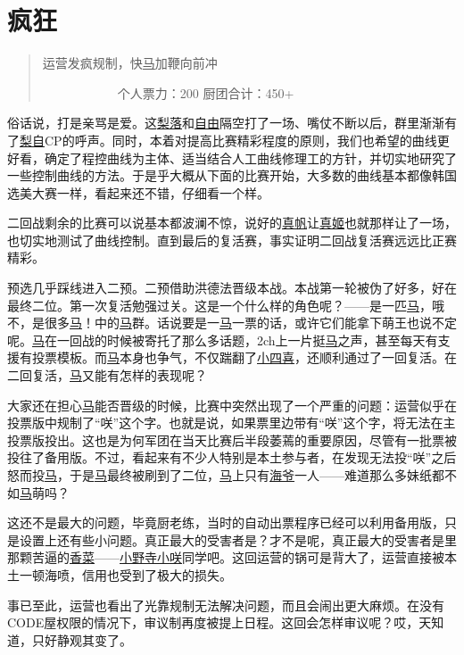 \chapter{疯狂}
\begin{quote}
运营发疯规制，快\uline{马}加鞭向前冲

　　　　　　个人票力：200 厨团合计：450+
\end{quote}

俗话说，打是亲骂是爱。这\uline{梨落}和\uline{自由}隔空打了一场、嘴仗不断以后，群里渐渐有了\uline{梨}\uline{自}CP的呼声。同时，本着对提高比赛精彩程度的原则，我们也希望的曲线更好看，确定了程控曲线为主体、适当结合人工曲线修理工的方针，并切实地研究了一些控制曲线的方法。于是乎大概从下面的比赛开始，大多数的曲线基本都像韩国选美大赛一样，看起来还不错，仔细看一个样。

二回战剩余的比赛可以说基本都波澜不惊，说好的\uline{真帆}让\uline{真姬}也就那样让了一场，也切实地测试了曲线控制。直到最后的复活赛，事实证明二回战复活赛远远比正赛精彩。

预选几乎踩线进入二预。二预借助洪德法晋级本战。本战第一轮被伪了好多，好在最终二位。第一次复活勉强过关。这是一个什么样的角色呢？——是一匹\uline{马}，哦不，是很多\uline{马}！中的\uline{马}群。话说要是一\uline{马}一票的话，或许它们能拿下萌王也说不定呢。\uline{马}在一回战的时候被寄托了那么多话题，2ch上一片挺\uline{马}之声，甚至每天有支援有投票模板。而\uline{马}本身也争气，不仅踹翻了\uline{小四喜}，还顺利通过了一回复活。在二回复活，\uline{马}又能有怎样的表现呢？

大家还在担心\uline{马}能否晋级的时候，比赛中突然出现了一个严重的问题：运营似乎在投票版中规制了“咲”这个字。也就是说，如果票里边带有“咲”这个字，将无法在主投票版投出。这也是为何军团在当天比赛后半段萎蔫的重要原因，尽管有一批票被投往了备用版。不过，看起来有不少人特别是本土参与者，在发现无法投“咲”之后怒而投\uline{马}，于是\uline{马}最终被刷到了二位，\uline{马}上只有\uline{海爷}一人——难道那么多妹纸都不如\uline{马}萌吗？

这还不是最大的问题，毕竟厨老练，当时的自动出票程序已经可以利用备用版，只是设置上还有些小问题。真正最大的受害者是？才不是呢，真正最大的受害者是里那颗苦逼的\uline{香菜}——\uline{小野寺小咲}同学吧。这回运营的锅可是背大了，运营直接被本土一顿海喷，信用也受到了极大的损失。

事已至此，运营也看出了光靠规制无法解决问题，而且会闹出更大麻烦。在没有CODE屋权限的情况下，审议制再度被提上日程。这回会怎样审议呢？哎，天知道，只好静观其变了。

